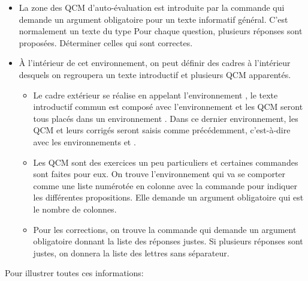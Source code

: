 \documentclass[nocrop]{sesamanuel}
\begin{document}
\renewcommand{\StringDOCUMENTATION}{Le Q.C.M.}
\begin{documentation}
\begin{itemize}
\item La zone des QCM d'auto-évaluation est introduite par la commande
 qui demande un argument obligatoire pour un
texte informatif général. C'est normalement un texte du type \og Pour
chaque question, plusieurs réponses sont proposées. Déterminer celles
qui sont correctes. \fg

\item À l'intérieur de cet environnement, on peut définir des cadres à
l'intérieur desquels on regroupera un texte introductif et plusieurs
QCM apparentés. 
\begin{itemize}
\item Le cadre extérieur se réalise en appelant
l'environnement , le texte introductif commun est composé
avec l'environnement  et les QCM seront tous
placés dans un environnement . Dans ce dernier
environnement, les QCM et leurs corrigés seront saisis comme
précédemment, c'est-à-dire avec les environnements 
et .

\item Les QCM sont des exercices un peu particuliers et certaines commandes
sont faites pour eux. On trouve l'environnement  qui
va se comporter comme une liste numérotée en colonne avec la commande
 pour indiquer les différentes propositions. Elle demande un
argument obligatoire qui est le nombre de colonnes. 
\item Pour les
corrections, on trouve la commande  qui demande un
argument obligatoire donnant la liste des réponses justes. Si
plusieurs réponses sont justes, on donnera la liste des lettres sans
séparateur.
\end{itemize}
\end{itemize}
\end{documentation}
Pour illustrer toutes ces informations:\vspace{-\baselineskip}
\end{document}
